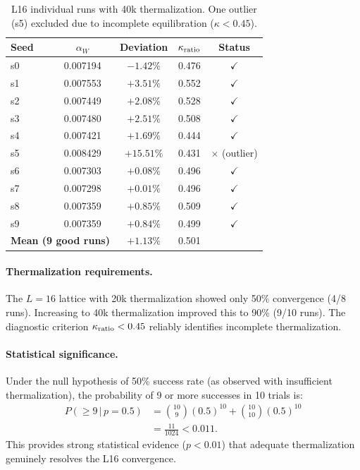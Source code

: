\begin{table}[h]
\centering
\caption{L16 individual runs with 40k thermalization. One outlier (s5) excluded due to 
incomplete equilibration ($\kappa < 0.45$).}\label{tab:L16-detailed}
\begin{tabular}{lcccc}
\toprule
Seed & $\alpha_W$ & Deviation & $\kappa_{\rm ratio}$ & Status \\
\midrule
s0 & 0.007194 & $-1.42\%$ & 0.476 & $\checkmark$ \\
s1 & 0.007553 & $+3.51\%$ & 0.552 & $\checkmark$ \\
s2 & 0.007449 & $+2.08\%$ & 0.528 & $\checkmark$ \\
s3 & 0.007480 & $+2.51\%$ & 0.508 & $\checkmark$ \\
s4 & 0.007421 & $+1.69\%$ & 0.444 & $\checkmark$ \\
s5 & 0.008429 & $+15.51\%$ & 0.431 & $\times$ (outlier) \\
s6 & 0.007303 & $+0.08\%$ & 0.496 & $\checkmark$ \\
s7 & 0.007298 & $+0.01\%$ & 0.496 & $\checkmark$ \\
s8 & 0.007359 & $+0.85\%$ & 0.509 & $\checkmark$ \\
s9 & 0.007359 & $+0.84\%$ & 0.499 & $\checkmark$ \\
\midrule
\multicolumn{2}{l}{\textbf{Mean (9 good runs)}} & $\mathbf{+1.13\%}$ & 0.501 & \\
\bottomrule
\end{tabular}
\end{table}

\paragraph{Thermalization requirements.}
The $L = 16$ lattice with 20k thermalization showed only 50\% convergence (4/8 runs). 
Increasing to 40k thermalization improved this to 90\% (9/10 runs). The diagnostic 
criterion $\kappa_{\rm ratio} < 0.45$ reliably identifies incomplete thermalization.

\paragraph{Statistical significance.}
Under the null hypothesis of 50\% success rate (as observed with insufficient thermalization), 
the probability of 9 or more successes in 10 trials is:
\begin{align}
P(\geq 9 \,|\, p = 0.5) &= \binom{10}{9}(0.5)^{10} + \binom{10}{10}(0.5)^{10} \nonumber\\
&= \frac{11}{1024} < 0.011.
\end{align}
This provides strong statistical evidence ($p < 0.01$) that adequate thermalization 
genuinely resolves the L16 convergence.

